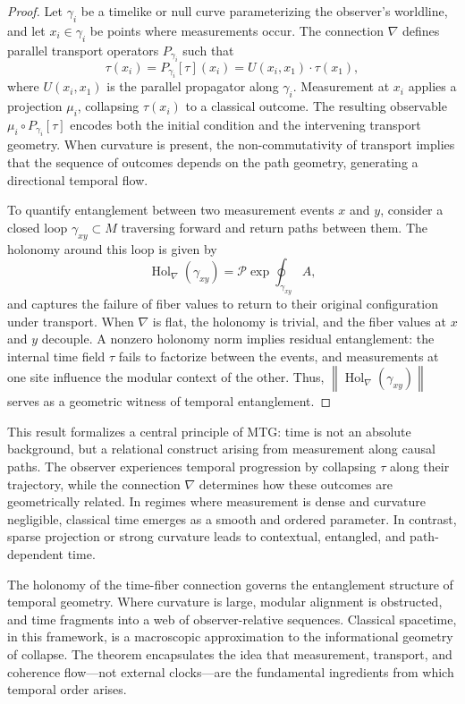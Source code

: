 \documentclass[11pt]{article}
\begin{document}
\begin{proof}
Let \( \gamma_i \) be a timelike or null curve parameterizing the observer’s worldline, and let \( x_i \in \gamma_i \) be points where measurements occur. The connection \( \nabla \) defines parallel transport operators \( P_{\gamma_i} \) such that
\[
\tau(x_i) = P_{\gamma_i}[\tau](x_i) = U(x_i, x_1) \cdot \tau(x_1),
\]
where \( U(x_i, x_1) \) is the parallel propagator along \( \gamma_i \). Measurement at \( x_i \) applies a projection \( \mu_i \), collapsing \( \tau(x_i) \) to a classical outcome. The resulting observable \( \mu_i \circ P_{\gamma_i}[\tau] \) encodes both the initial condition and the intervening transport geometry. When curvature is present, the non-commutativity of transport implies that the sequence of outcomes depends on the path geometry, generating a directional temporal flow.

To quantify entanglement between two measurement events \( x \) and \( y \), consider a closed loop \( \gamma_{xy} \subset M \) traversing forward and return paths between them. The holonomy around this loop is given by
\[
\operatorname{Hol}_\nabla(\gamma_{xy}) = \mathcal{P} \exp \oint_{\gamma_{xy}} A,
\]
and captures the failure of fiber values to return to their original configuration under transport. When \( \nabla \) is flat, the holonomy is trivial, and the fiber values at \( x \) and \( y \) decouple. A nonzero holonomy norm implies residual entanglement: the internal time field \( \tau \) fails to factorize between the events, and measurements at one site influence the modular context of the other. Thus, \( \left\| \operatorname{Hol}_\nabla(\gamma_{xy}) \right\| \) serves as a geometric witness of temporal entanglement.
\end{proof}

This result formalizes a central principle of MTG: time is not an absolute background, but a relational construct arising from measurement along causal paths. The observer experiences temporal progression by collapsing \( \tau \) along their trajectory, while the connection \( \nabla \) determines how these outcomes are geometrically related. In regimes where measurement is dense and curvature negligible, classical time emerges as a smooth and ordered parameter. In contrast, sparse projection or strong curvature leads to contextual, entangled, and path-dependent time.

The holonomy of the time-fiber connection governs the entanglement structure of temporal geometry. Where curvature is large, modular alignment is obstructed, and time fragments into a web of observer-relative sequences. Classical spacetime, in this framework, is a macroscopic approximation to the informational geometry of collapse. The theorem encapsulates the idea that measurement, transport, and coherence flow—not external clocks—are the fundamental ingredients from which temporal order arises.
\end{document}
